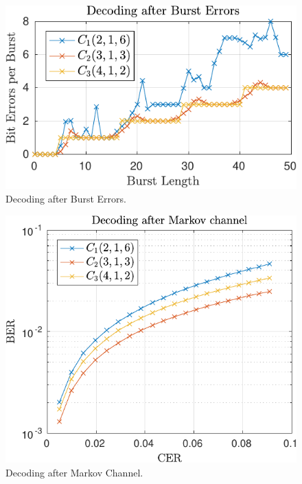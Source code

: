 \begin{figure}
\centering
\includegraphics[scale=1]{../figures/burstErrors-crop.pdf} 
\caption{Decoding after Burst Errors.}
\end{figure}

\begin{figure}
\centering
\includegraphics[scale=1]{../figures/markovErrorsSpecd.pdf} 
\caption{Decoding after Markov Channel.}
\end{figure}